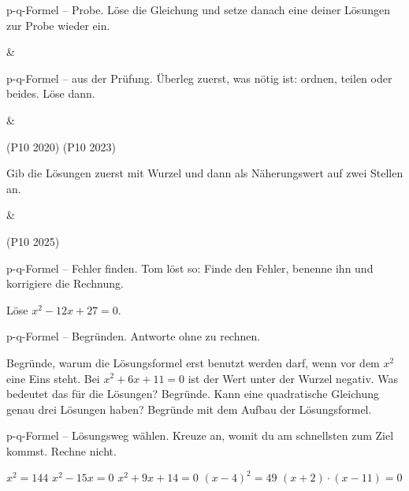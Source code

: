 \begin{aufgabe}{p-q-Formel -- Probe. Löse die Gleichung und setze danach eine deiner
Lösungen zur Probe wieder ein.}
\begin{gleichungsraster}[5]
 &  \\
\end{gleichungsraster}
\end{aufgabe}

\begin{aufgabe}{p-q-Formel -- aus der Prüfung. Überleg zuerst, was nötig ist: ordnen,
teilen oder beides. Löse dann.}
\begin{gleichungsraster}[5]
 &  \\
\end{gleichungsraster}
\hfill (P10 2020) \qquad (P10 2023)

Gib die Lösungen zuerst mit Wurzel und dann als Näherungswert auf zwei Stellen an.
\begin{gleichungsraster}[5]
 & \\
\end{gleichungsraster}
\hfill (P10 2025)
\end{aufgabe}

\begin{aufgabe}{p-q-Formel -- Fehler finden. Tom löst so:}
Finde den Fehler, benenne ihn und korrigiere die Rechnung.

\begin{teile}
\teil Löse $x^2 - 12x + 27 = 0$.
\end{teile}
\end{aufgabe}

\begin{aufgabe}{p-q-Formel -- Begründen. Antworte ohne zu rechnen.}
\begin{teile}
\teil Begründe, warum die Lösungsformel erst benutzt werden darf, wenn vor dem $x^2$
eine Eins steht.
\teil Bei $x^2 + 6x + 11 = 0$ ist der Wert unter der Wurzel negativ. Was bedeutet das
für die Lösungen? Begründe.
\teil Kann eine quadratische Gleichung genau drei Lösungen haben? Begründe mit dem
Aufbau der Lösungsformel.
\end{teile}
\end{aufgabe}

\begin{aufgabe}{p-q-Formel -- Lösungsweg wählen. Kreuze an, womit du am schnellsten
zum Ziel kommst. Rechne nicht.}
\begin{teile}
\teil $x^2 = 144$ \hfill {}
\teil $x^2 - 15x = 0$ \hfill {}
\teil $x^2 + 9x + 14 = 0$ \hfill {}
\teil $(x - 4)^2 = 49$ \hfill {}
\teil $(x + 2) \cdot (x - 11) = 0$ \hfill {}
\end{teile}
\end{aufgabe}
